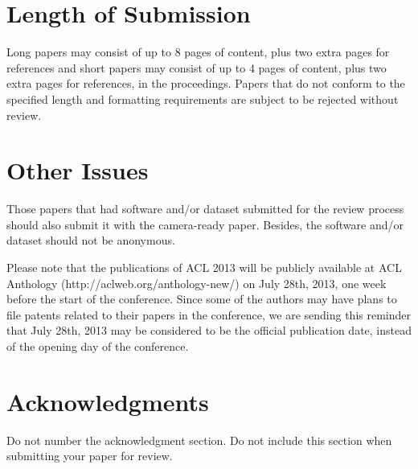 \documentclass[11pt]{article}
\begin{document}
\section{Length of Submission}
\label{sec:length}

Long papers may consist of up to 8 pages of content, plus two extra pages for references
and short papers may consist of up to 4 pages of content, plus two extra pages for references, in the proceedings.
Papers that do not conform to the specified length and formatting requirements are
subject to be rejected without review.

\section{Other Issues}

Those papers that had software and/or dataset submitted for the review process should also submit it 
with the camera-ready paper. Besides, the software and/or dataset should not be anonymous. 

Please note that the publications of ACL 2013 will be publicly available at ACL Anthology 
(http://aclweb.org/anthology-new/) on July 28th, 2013, one week before the start of the conference. 
Since some of the authors may have plans to file patents related to their papers in the conference, 
we are sending this reminder that July 28th, 2013 may be considered to be the official publication date, 
instead of the opening day of the conference.

\section*{Acknowledgments}

Do not number the acknowledgment section. Do not include this section
when submitting your paper for review.
%
%
\end{document}
